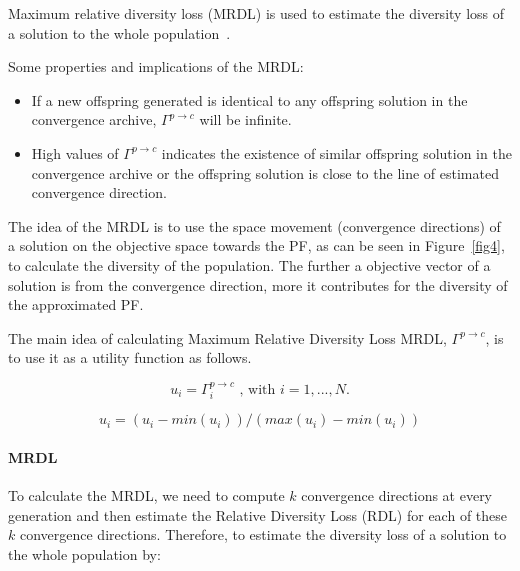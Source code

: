 \documentclass{IEEEtran}
\begin{document}
Maximum relative diversity loss (MRDL) is used to estimate the diversity loss of a solution to the whole population~\cite{gee2015online}.

 Some properties and implications of the MRDL:
\begin{itemize}
	\item If a new offspring generated is identical to any offspring solution in the convergence archive, $\Gamma^{p \rightarrow c}$  will be infinite.
	\item High values of $\Gamma^{p \rightarrow c}$ indicates the existence of similar offspring solution in the convergence archive or the offspring solution is close to the line of estimated convergence direction. 
\end{itemize}

The idea of the MRDL is to use the space movement (convergence directions) of a solution on the objective space towards the PF, as can be seen in Figure~\ref{fig4}, to calculate the diversity of the population. The further a objective vector of a solution is from the convergence direction, more it contributes for the diversity of the approximated PF.



The main idea of calculating Maximum Relative Diversity Loss MRDL, $\Gamma^{p \rightarrow c}$, is to use it as a utility function as follows.

\begin{equation}
u_i = \Gamma^{p \rightarrow c}_i \text{ , with  $i=1,...,N$.}
\end{equation}

\begin{equation}
u_i = (u_i - min(u_i)) / (max(u_i) - min(u_i))
\end{equation}

\paragraph{MRDL} To calculate the MRDL, we need to compute $k$ convergence directions at every generation and then estimate the Relative Diversity Loss (RDL) for each of these $k$ convergence directions. Therefore, to estimate the diversity loss of a solution to the whole population by:
 
\end{document}
